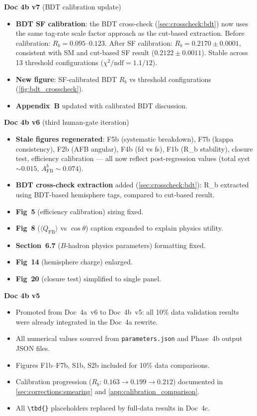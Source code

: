 \documentclass[11pt,a4paper]{article}
\newcommand{\tbd}[1]{\textcolor{gray}{\textit{#1}}}
\begin{document}
\textbf{Doc 4b v7} (BDT calibration update)
\begin{itemize}
\item \textbf{BDT SF calibration}: the BDT cross-check (\cref{sec:crosscheck:bdt})
  now uses the same tag-rate scale factor approach as the cut-based extraction.
  Before calibration: $R_b = 0.095$--$0.123$.
  After SF calibration: $R_b = 0.2170 \pm 0.0001$, consistent with SM and
  cut-based SF result ($0.2122 \pm 0.0011$).
  Stable across 13 threshold configurations ($\chi^2/\text{ndf} = 1.1/12$).
\item \textbf{New figure}: SF-calibrated BDT $R_b$ vs threshold configurations
  (\cref{fig:bdt_crosscheck}).
\item \textbf{Appendix~B} updated with calibrated BDT discussion.
\end{itemize}

\textbf{Doc 4b v6} (third human-gate iteration)
\begin{itemize}
\item \textbf{Stale figures regenerated}: F5b (systematic breakdown),
  F7b (kappa consistency), F2b (AFB angular), F4b (fd vs fs), F1b (R\_b
  stability), closure test, efficiency calibration --- all now reflect
  post-regression values (total syst $\sim 0.015$, $A_\text{FB}^b \sim 0.074$).
\item \textbf{BDT cross-check extraction} added (\cref{sec:crosscheck:bdt}):
  R\_b extracted using BDT-based hemisphere tags, compared to cut-based result.
\item \textbf{Fig~5} (efficiency calibration) sizing fixed.
\item \textbf{Fig~8} ($\langle Q_\text{FB}\rangle$ vs $\cos\theta$) caption
  expanded to explain physics utility.
\item \textbf{Section~6.7} ($B$-hadron physics parameters) formatting fixed.
\item \textbf{Fig~14} (hemisphere charge) enlarged.
\item \textbf{Fig~20} (closure test) simplified to single panel.
\end{itemize}

\textbf{Doc 4b v5}
\begin{itemize}
\item Promoted from Doc~4a~v6 to Doc~4b~v5: all 10\% data validation
  results were already integrated in the Doc~4a rewrite.
\item All numerical values sourced from \texttt{parameters.json} and
  Phase~4b output JSON files.
\item Figures F1b--F7b, S1b, S2b included for 10\% data comparisons.
\item Calibration progression ($R_b$: $0.163 \to 0.199 \to 0.212$)
  documented in \cref{sec:corrections:smearing} and \cref{app:calibration_comparison}.
\item All \verb|\tbd{}| placeholders replaced by full-data results in Doc~4c.
\end{itemize}
\end{document}
